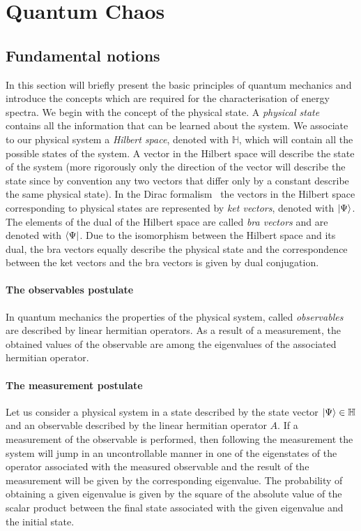 \documentclass[../thesis.tex]{subfiles}
\theoremstyle{definition}
\begin{document}
\chapter{Quantum Chaos}
\label{chap:quantum-chaos}

\section{Fundamental notions}

In this section will briefly present the basic principles of quantum mechanics
and introduce the concepts which are required for the characterisation of
energy spectra.
We begin with the concept of the physical state.
A \emph{physical state} contains all the information that can be learned
about the system.
We associate to our physical system a \emph{Hilbert space}, denoted with
\(\mathbb{H}\), which will contain all the possible states of the system.
A vector in the Hilbert space will describe the state of the system
(more rigorously only the direction of the vector will describe the state
since by convention any two vectors that differ only by a constant describe
the same physical state). In the Dirac formalism~\cite{Dirac1967} the vectors in the Hilbert
space corresponding to physical states are represented by \emph{ket vectors},
denoted with \(\ket{\Psi}\). The elements of the dual of the Hilbert space
are called \emph{bra vectors} and are denoted with \(\bra{\Psi}\). Due to the
isomorphism between the Hilbert space and its dual, the bra vectors equally
describe the physical state and the correspondence between the ket vectors and
the bra vectors is given by dual conjugation.

\subsubsection{The observables postulate}

In quantum mechanics the properties of the physical system, called \emph{observables}
are described by linear hermitian operators.
As a result of a measurement, the obtained values of the observable are among
the eigenvalues of the associated hermitian operator.

\subsubsection{The measurement postulate}

Let us consider a physical system in a state described by the state vector
\(\ket{\Psi} \in \mathbb{H}\) and an observable described by the linear hermitian
operator \(A\). If a measurement of the observable is performed, then following
the measurement the system will jump in an uncontrollable manner in one of the
eigenstates of the operator associated with the measured observable and the result
of the measurement will be given by the corresponding eigenvalue. The probability
of obtaining a given eigenvalue is given by the square of the absolute value of
the scalar product between the final state associated with the given eigenvalue
and the initial state.
\end{document}
